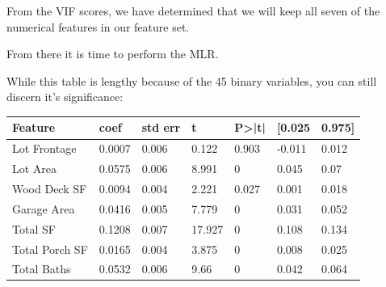\documentclass{article}
\begin{document}
	From the VIF scores, we have determined that we will keep all seven of the numerical features in our feature set. 

	From there it is time to perform the MLR.

	While this table is lengthy because of the 45 binary variables, you can still discern it's significance:

	\begin{table}[]
		\centering
		\begin{tabular}{lllllll}
		\hline
		\multicolumn{1}{|l|}{Feature}    & \multicolumn{1}{l|}{coef} & \multicolumn{1}{l|}{std err} & \multicolumn{1}{l|}{t} & \multicolumn{1}{l|}{P\textgreater{}|t|} & \multicolumn{1}{l|}{{[}0.025} & \multicolumn{1}{l|}{0.975{]}} \\ \hline
		Lot Frontage                     & 0.0007                    & 0.006                        & 0.122                  & 0.903                                   & -0.011                        & 0.012                         \\
		Lot Area                         & 0.0575                    & 0.006                        & 8.991                  & 0                                       & 0.045                         & 0.07                          \\
		Wood Deck SF                     & 0.0094                    & 0.004                        & 2.221                  & 0.027                                   & 0.001                         & 0.018                         \\
		Garage Area                      & 0.0416                    & 0.005                        & 7.779                  & 0                                       & 0.031                         & 0.052                         \\
		Total SF                         & 0.1208                    & 0.007                        & 17.927                 & 0                                       & 0.108                         & 0.134                         \\
		Total Porch SF                   & 0.0165                    & 0.004                        & 3.875                  & 0                                       & 0.008                         & 0.025                         \\
		Total Baths                      & 0.0532                    & 0.006                        & 9.66                   & 0                                       & 0.042                         & 0.064                         \\

\end{tabular}
\end{table}
\end{document}

